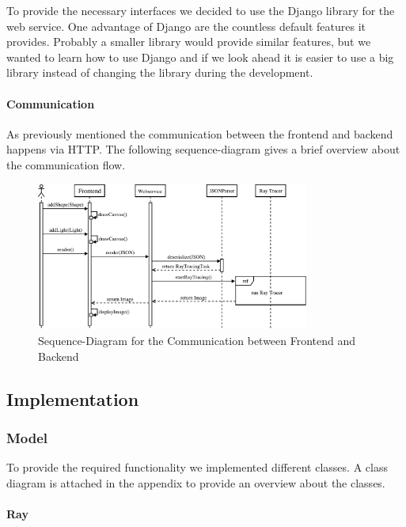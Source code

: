 \documentclass[10pt]{scrartcl}
\begin{document}
To provide the necessary interfaces we decided to use the Django library for the web service. One advantage of Django are the countless default features it provides. Probably a smaller library would provide similar features, but we wanted to learn how to use Django and if we look ahead it is easier to use a big library instead of changing the library during the development.

\paragraph{Communication}

As previously mentioned the communication between the frontend and backend happens via HTTP. The following sequence-diagram gives a brief overview about the communication flow.

\begin{figure}[h]
  \centering
  \includegraphics[width=0.8\textwidth]{images/seq_comm.pdf}
  \caption{Sequence-Diagram for the Communication between Frontend and Backend} 
  \label{fig:seqcom} 
\end{figure}

\subsection{Implementation}

\subsubsection{Model}

To provide the required functionality we implemented different classes. A class diagram is attached in the appendix to provide an overview about the classes.

\paragraph{Ray}
\end{document}
